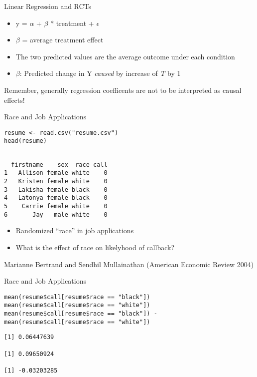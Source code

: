 \documentclass[presentation]{beamer}
\begin{document}
\begin{frame}[label={sec:org0e5b78b}]{Linear Regression and RCTs}
\begin{itemize}
\item y = \(\alpha\) + \(\beta\) * treatment + \(\epsilon\)

\item \(\beta\) = average treatment effect

\item The two predicted values are the average outcome under each condition
\end{itemize}

\pause

\begin{itemize}
\item \(\beta\): Predicted change in Y \emph{caused} by increase of \emph{T} by 1
\end{itemize}

\pause

\alert{Remember, generally regression coefficents are not to be interpreted as causal effects!}
\end{frame}

\begin{frame}[fragile,shrink=20,label={sec:orgbad7774}]{Race and Job Applications}
 \begin{verbatim}
resume <- read.csv("resume.csv")
head(resume)
\end{verbatim}

\begin{verbatim}

  firstname    sex  race call
1   Allison female white    0
2   Kristen female white    0
3   Lakisha female black    0
4   Latonya female black    0
5    Carrie female white    0
6       Jay   male white    0
\end{verbatim}

\begin{itemize}
\item Randomized ``race'' in job applications
\item What is the effect of race on likelyhood of callback?
\end{itemize}

\alert{Marianne Bertrand and Sendhil Mullainathan (American Economic Review 2004)}
\end{frame}

\begin{frame}[fragile,shrink=30,label={sec:orgb1b3b06}]{Race and Job Applications}
 \begin{verbatim}
mean(resume$call[resume$race == "black"])
mean(resume$call[resume$race == "white"])
mean(resume$call[resume$race == "black"]) - mean(resume$call[resume$race == "white"])
\end{verbatim}

\begin{verbatim}
[1] 0.06447639

[1] 0.09650924

[1] -0.03203285
\end{verbatim}
\end{frame}
\end{document}
